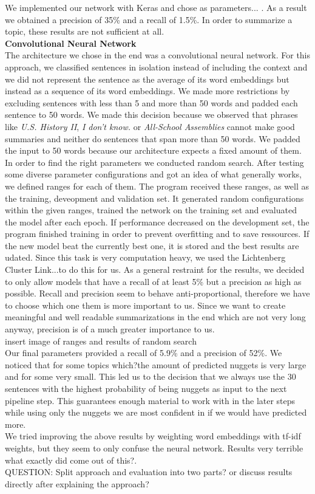 We implemented our network with Keras and chose as parameters... . As a result we obtained a precision of 35\% and a recall of 1.5\%. In order to summarize a topic, these results are not sufficient at all.\\
\textbf{Convolutional Neural Network}\\
The architecture we chose in the end was a convolutional neural network. For this approach, we classified sentences in isolation instead of including the context and we did not represent the sentence as the average of its word embeddings but instead as a sequence of its word embeddings. We made more restrictions by excluding sentences with less than 5 and more than 50 words and padded each sentence to 50 words. We made this decision because we observed that phrases like \textit{U.S. History II}, \textit{I don't know.} or \textit{All-School Assemblies} cannot make good summaries and neither do sentences that span more than 50 words. We padded the input to 50 words because our architecture expects a fixed amount of them.\\
In order to find the right parameters we conducted random search. After testing some diverse parameter configurations and got an idea of what generally works, we defined ranges for each of them. The program received these ranges, as well as the training, deveopment and validation set. It generated random configurations within the given ranges, trained the network on the training set and evaluated the model after each epoch. If performance decreased on the development set, the program finished training in order to prevent overfitting and to save ressources. If the new model beat the currently best one, it is stored and the best results are udated. Since this task is very computation heavy, we used the Lichtenberg Cluster \lbrack Link...\rbrack to do this for us. As a general restraint for the results, we decided to only allow models that have a recall of at least 5\% but a precision as high as possible. Recall and precision seem to behave anti-proportional, therefore we have to choose which one them is more important to us. Since we want to create meaningful and well readable summarizations in the end which are not very long anyway, precision is of a much greater importance to us. \\
\lbrack insert image of ranges and results of random search\rbrack \\
Our final parameters provided a recall of 5.9\% and a precision of 52\%. We noticed that for some topics \lbrack which?\rbrack the amount of predicted nuggets is very large and for some very small. This led us to the decision that we always use the 30 sentences with the highest probability of being nuggets as input to the next pipeline step. This guarantees enough material to work with in the 
later steps while using only the nuggets we are most confident in if we would have predicted more.\\
We tried improving the above results by weighting word embeddings with tf-idf weights, but they seem to only confuse the neural network. Results very terrible \lbrack what exactly did come out of this?\rbrack .\\
QUESTION: Split approach and evaluation into two parts? or discuss results directly after explaining the approach?

